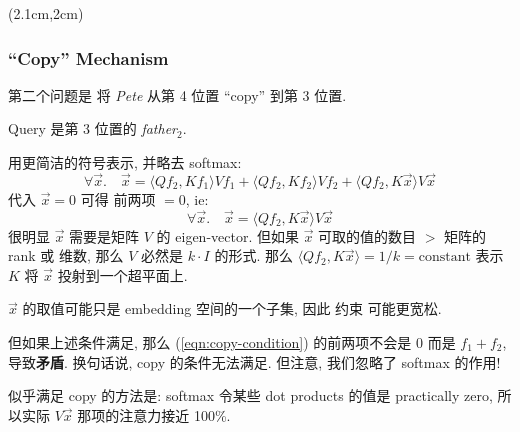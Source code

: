 \begin{preview}
\begin{minipage}{\textwidth}
	
\setlength{\parskip}{0.4\baselineskip}
\begin{textblock*}{20cm}(2.1cm,2cm) %
	{}
	\hspace{8cm}
\end{textblock*}

\vspace*{0.3cm} 

\subsubsection{``Copy'' Mechanism}

第二个问题是 将 \textit{Pete} 从第 4 位置 ``copy'' 到第 3 位置.

Query 是第 3 位置的 \textit{father}$_2$.

用更简洁的符号表示, 并略去 softmax:
\begin{equation}
\forall \vec{x}. \quad \vec{x} = \langle Q f_2, K f_1 \rangle V f_1 + \langle Q f_2, K f_2 \rangle V f_2 + \langle Q f_2, K \vec{x} \rangle V \vec{x}
\label{eqn:copy-condition}
\end{equation}
代入 $\vec{x} = 0$ 可得 前两项 $= 0$, ie:
\begin{equation}
\forall \vec{x}. \quad \vec{x} = \langle Q f_2, K \vec{x} \rangle V \vec{x}
\end{equation}
很明显 $\vec{x}$ 需要是矩阵 $V$ 的 eigen-vector.  但如果 $\vec{x}$ 可取的值的数目 $>$ 矩阵的 rank 或 维数, 那么 $V$ 必然是 $k \cdot I$ 的形式.  那么 $\langle Q f_2, K \vec{x} \rangle = 1/k = \mbox{constant}$ 表示 $K$ 将 $\vec{x}$ 投射到一个超平面上.

$\vec{x}$ 的取值可能只是 embedding 空间的一个子集, 因此 约束 可能更宽松.

但如果上述条件满足, 那么 (\ref{eqn:copy-condition}) 的前两项不会是 0 而是 $f_1 + f_2$, 导致\textbf{矛盾}.  换句话说, copy 的条件无法满足.  但注意, 我们忽略了 softmax 的作用!

似乎满足 copy 的方法是: softmax 令某些 dot products 的值是 practically zero, 所以实际 $V \vec{x}$ 那项的注意力接近 100\%.


\end{minipage}
\end{preview}

